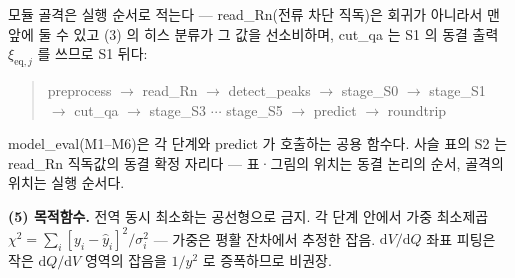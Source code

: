 \documentclass[11pt,a4paper]{article}
\newcommand{\dd}{\mathrm{d}}
\newcommand{\eq}{\mathrm{eq}}
\begin{document}
모듈 골격은 실행 순서로 적는다 — read\_Rn(전류 차단 직독)은 회귀가 아니라서 맨 앞에 둘 수 있고 (3)
의 히스 분류가 그 값을 선소비하며, cut\_qa 는 S1 의 동결 출력 $\xi_{\eq,j}$ 를 쓰므로 S1 뒤다:
\begin{quote}\ttfamily\footnotesize
preprocess $\to$ read\_Rn $\to$ detect\_peaks $\to$ stage\_S0 $\to$ stage\_S1\\
$\to$ cut\_qa $\to$ stage\_S3 $\cdots$ stage\_S5 $\to$ predict $\to$ roundtrip
\end{quote}
model\_eval(M1--M6)은 각 단계와 predict 가 호출하는 공용 함수다. 사슬 표의 S2 는 read\_Rn 직독값의
동결 확정 자리다 — 표·그림의 위치는 동결 논리의 순서, 골격의 위치는 실행 순서다.

\textbf{(5) 목적함수.} 전역 동시 최소화는 공선형으로 금지. 각 단계 안에서 가중 최소제곱
$\chi^2=\sum_i[y_i-\widehat y_i]^2/\sigma_i^2$ — 가중은 평활 잔차에서 추정한 잡음. $\dd V/\dd Q$
좌표 피팅은 작은 $\dd Q/\dd V$ 영역의 잡음을 $1/y^2$ 로 증폭하므로 비권장.
\end{document}
